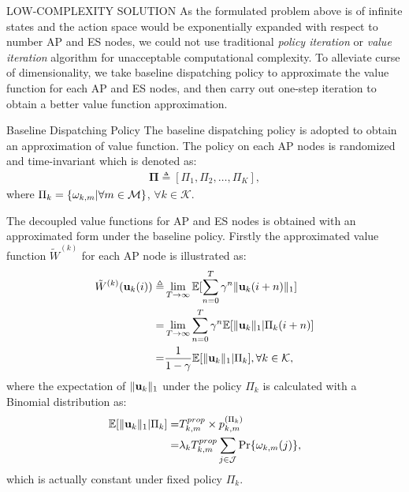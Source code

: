 \documentclass[10pt, conference, letterpaper]{IEEEtran}
\newcommand{\define}{\triangleq}
\renewcommand{\vec}{\mathbf}
\DeclarePairedDelimiter{\set}{\{}{\}}
\DeclarePairedDelimiter{\Inorm}{\|}{\|_1}
\newcommand{\apSet}{\mathcal{K}}
\newcommand{\esSet}{\mathcal{M}}
\newcommand{\jSet}{\mathcal{J}}
\begin{document}
    \begin{section}{LOW-COMPLEXITY SOLUTION}
        \label{sec:algorithm}
        As the formulated problem above is of infinite states and the action space would be exponentially expanded with respect to number AP and ES nodes, we could not use traditional \emph{policy iteration} or \emph{value iteration} algorithm \cite{sutton1998introduction} for unacceptable computational complexity.
        To alleviate curse of dimensionality, we take baseline dispatching policy to approximate the value function for each AP and ES nodes, and then carry out one-step iteration to obtain a better value function approximation.

        \begin{subsection}{Baseline Dispatching Policy}
            The baseline dispatching policy is adopted to obtain an approximation of value function. The policy on each AP nodes is randomized and time-invariant which is denoted as:
            \begin{align}
                \vec{\Pi} \define [\Pi_1, \Pi_2, \dots, \Pi_K],
            \end{align}
            where $\Pi_k = \set{\omega_{k,m}|\forall m\in\esSet}$, $\forall k\in\apSet$.

            The decoupled value functions for AP and ES nodes is obtained with an approximated form under the baseline policy. Firstly the approximated value function $\tilde{W}^{(k)}$ for each AP node is illustrated as:
            \begin{align}
                \tilde{W}^{(k)}(\vec{u}_k(i)) \define& \lim_{T\to\infty} \mathbb{E}[\sum_{n=0}^{T} \gamma^{n} \Inorm{\vec{u}_k(i+n)}]
                \nonumber\\
                =& \lim_{T\to\infty} \sum_{n=0}^{T} \gamma^{n} \mathbb{E}[\Inorm{\vec{u}_k}|\Pi_k(i+n)]
                \nonumber\\
                =& \frac{1}{1-\gamma} \mathbb{E}[\Inorm{\vec{u}_k}|\Pi_k], \forall k\in\apSet, 
            \end{align}
            where the expectation of $\Inorm{\vec{u}_k}$ under the policy $\Pi_k$ is calculated with a Binomial distribution as:
            \begin{align}
                \mathbb{E}[\Inorm{\vec{u}_k}|\Pi_k] =& T^{prop}_{k,m} \times p^{(\Pi_k)}_{k,m}
                \nonumber\\
                =& \lambda_k T^{prop}_{k,m} \sum_{j\in\jSet} \Pr\{\omega_{k,m}(j)\},
            \end{align}
            which is actually constant under fixed policy $\Pi_k$.
            

\end{subsection}
\end{section}
\end{document}
